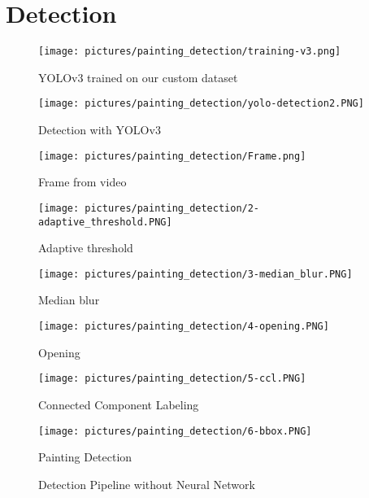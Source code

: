 \section{Detection}



\begin{figure}[h!]
    \centering
        \texttt{[image: pictures/painting\_detection/training-v3.png]}
    \caption{YOLOv3 trained on our custom dataset}
    \label{fig:training-v3}
\end{figure} 

\begin{figure}[h!]
    \centering
        \texttt{[image: pictures/painting\_detection/yolo-detection2.PNG]}
    \caption{Detection with YOLOv3}
    \label{fig:yolo_detection}
\end{figure} 


\begin{figure*}[h]
      \texttt{[image: pictures/painting\_detection/Frame.png]}
      \caption*{Frame from video}\label{fig:Frame}
    \endminipage\hfill
      \texttt{[image: pictures/painting\_detection/2-adaptive\_threshold.PNG]}
      \caption*{Adaptive threshold}\label{fig:adaptive_threshold}
    \endminipage\hfill
      \texttt{[image: pictures/painting\_detection/3-median\_blur.PNG]}
      \caption*{Median blur}\label{fig:median_blur}
    \endminipage
\end{figure*}


\begin{figure*}[h]

      \texttt{[image: pictures/painting\_detection/4-opening.PNG]}
      \caption*{Opening}\label{fig:opening}
    \endminipage\hfill
    \vspace*{+4mm}
      \texttt{[image: pictures/painting\_detection/5-ccl.PNG]}
      \caption*{Connected Component Labeling}\label{fig:ccl}
    \endminipage\hfill
      \texttt{[image: pictures/painting\_detection/6-bbox.PNG]}
      \caption*{Painting Detection}\label{fig:bbox}
    \endminipage
    \caption{Detection Pipeline without Neural Network} \label{fig:pipeline_detection}
\end{figure*}

